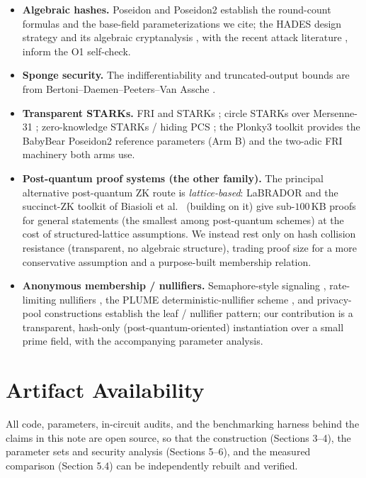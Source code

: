 \documentclass[11pt]{article}
\theoremstyle{plain}
\theoremstyle{definition}
\begin{document}
\begin{itemize}[leftmargin=*]
\item \textbf{Algebraic hashes.} Poseidon \cite{GKRRS21} and Poseidon2 \cite{GKS23} establish the
  round-count formulas and the base-field parameterizations we cite; the HADES design strategy and
  its algebraic cryptanalysis \cite{ABM23}, with the recent attack literature
  \cite{Bariant22,FreeLunch,CheapLunch,GKR25}, inform the O1 self-check.
\item \textbf{Sponge security.} The indifferentiability and truncated-output bounds are from
  Bertoni--Daemen--Peeters--Van Assche \cite{BDPV07,BDPV08}.
\item \textbf{Transparent STARKs.} FRI and STARKs \cite{BBHR18,BGKS20}; circle STARKs over
  Mersenne-31 \cite{HLP24}; zero-knowledge STARKs / hiding PCS \cite{BCRSVW19,Hab22}; the Plonky3
  toolkit \cite{Plonky3} provides the BabyBear Poseidon2 reference parameters (Arm B) and the
  two-adic FRI machinery both arms use.
\item \textbf{Post-quantum proof systems (the other family).} The principal alternative post-quantum
  ZK route is \emph{lattice-based}: LaBRADOR \cite{LaBRADOR} and the succinct-ZK toolkit of Biasioli
  et al.\ \cite{BBL26} (building on it) give sub-$100$\,KB proofs for general statements (the
  smallest among post-quantum schemes) at the cost of structured-lattice assumptions. We instead
  rest only on hash collision resistance (transparent, no algebraic structure), trading proof size
  for a more conservative assumption and a purpose-built membership relation.
\item \textbf{Anonymous membership / nullifiers.} Semaphore-style signaling \cite{Sem}, rate-limiting
  nullifiers \cite{RLN}, the PLUME deterministic-nullifier scheme \cite{PLUME}, and privacy-pool
  constructions establish the leaf / nullifier pattern; our
  contribution is a transparent, hash-only (post-quantum-oriented) instantiation over a small prime
  field, with the accompanying parameter analysis.
\end{itemize}

\section*{Artifact Availability}

All code, parameters, in-circuit audits, and the benchmarking harness behind the claims in this note
are open source, so that the construction (Sections 3--4), the parameter sets and security analysis
(Sections 5--6), and the measured comparison (Section 5.4) can be independently rebuilt and verified.
\end{document}
